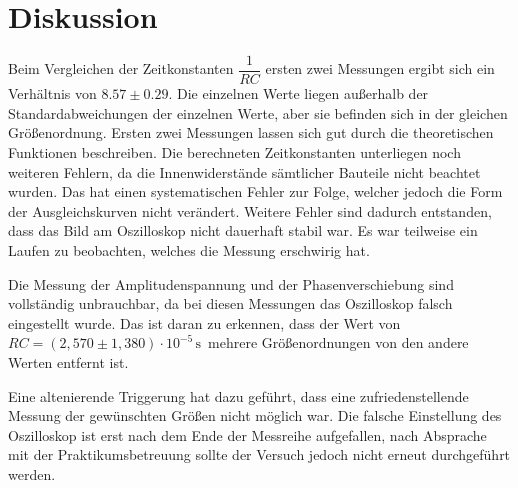 \section{Diskussion}
\label{sec:Diskussion}


Beim Vergleichen der Zeitkonstanten $ \dfrac{1}{RC}$ ersten zwei Messungen ergibt sich ein Verhältnis von  $8.57 \pm 0.29$. 
Die einzelnen Werte liegen außerhalb der Standardabweichungen der einzelnen Werte, aber sie befinden sich in der gleichen Größenordnung.
Ersten zwei Messungen lassen sich gut durch die theoretischen Funktionen beschreiben.
Die berechneten Zeitkonstanten unterliegen noch weiteren Fehlern, da die Innenwiderstände sämtlicher Bauteile nicht beachtet wurden. 
Das hat einen systematischen Fehler zur Folge, welcher jedoch die Form der Ausgleichskurven nicht verändert.
Weitere Fehler sind dadurch entstanden, dass das Bild am Oszilloskop nicht dauerhaft stabil war. Es war teilweise ein Laufen zu beobachten, welches die Messung erschwirig hat. 

Die Messung der Amplitudenspannung und der Phasenverschiebung sind vollständig unbrauchbar, da bei diesen Messungen das Oszilloskop falsch eingestellt wurde.
Das ist daran zu erkennen, dass der Wert von $RC = (2,570 \pm 1,380) \cdot 10^{-5} \, \unit{\second} \,$ mehrere Größenordnungen von den andere Werten entfernt ist.

Eine altenierende Triggerung hat dazu geführt, dass eine zufriedenstellende Messung der gewünschten Größen nicht möglich war.
Die falsche Einstellung des Oszilloskop ist erst nach dem Ende der Messreihe aufgefallen, nach Absprache mit der Praktikumsbetreuung sollte der Versuch jedoch nicht erneut durchgeführt werden.